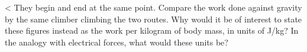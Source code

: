 <%
They begin and end at the same point. Compare the work done against gravity by the
same climber climbing the two routes. Why would it be of interest to state these
figures instead as the work per kilogram of body mass, in units of J/kg? In the analogy with electrical
forces, what would these units be?
